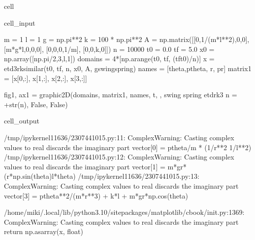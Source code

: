 \documentclass[letterpaper,10pt,english]{jupyterBook}
\begin{document}
\begin{sphinxuseclass}{cell}\begin{sphinxVerbatimInput}

\begin{sphinxuseclass}{cell_input}
\begin{sphinxVerbatim}[commandchars=\\\{\}]
m = 1
l = 1
g = np.pi**2
k = 100 * np.pi**2
A = np.matrix([[0,\PYGZhy{}1/(m*l**2),0,0], [m*g*l,0,0,0], [0,0,0,\PYGZhy{}1/m], [0,0,k,0]])
n = 10000
t0 = 0.0
tf = 5.0
x0 = np.array([np.pi/2,3,l,1])
domains = 4*[np.arange(t0, tf, (tf\PYGZhy{}t0)/n)]
x = etd3rk\PYGZus{}similar(t0, tf, n, x0, A, g\PYGZus{}swing\PYGZus{}spring)
names = [\PYGZsq{}theta\PYGZsq{},\PYGZsq{}p\PYGZus{}theta\PYGZsq{}, \PYGZsq{}r\PYGZsq{}, \PYGZsq{}pr\PYGZsq{}]
matrix1 = [x[0,:], x[1,:], x[2,:], x[3,:]]

fig1, ax1 = graphic\PYGZus{}2D(domains, matrix1, names, \PYGZsq{}t\PYGZsq{}, \PYGZsq{} \PYGZsq{}, \PYGZsq{}swing spring etdrk3 n = \PYGZsq{}+str(n), False, False)
\end{sphinxVerbatim}

\end{sphinxuseclass}\end{sphinxVerbatimInput}
\begin{sphinxVerbatimOutput}

\begin{sphinxuseclass}{cell_output}
\begin{sphinxVerbatim}[commandchars=\\\{\}]
/tmp/ipykernel\PYGZus{}11636/2307441015.py:11: ComplexWarning: Casting complex values to real discards the imaginary part
  vector[0] = p\PYGZus{}theta/m * (1/r**2 \PYGZhy{} 1/l**2)
/tmp/ipykernel\PYGZus{}11636/2307441015.py:12: ComplexWarning: Casting complex values to real discards the imaginary part
  vector[1] = \PYGZhy{}m*gr*(r*np.sin(theta)\PYGZhy{}l*theta)
/tmp/ipykernel\PYGZus{}11636/2307441015.py:13: ComplexWarning: Casting complex values to real discards the imaginary part
  vector[3] = p\PYGZus{}theta**2/(m*r**3) + k*l + m*gr*np.cos(theta)
\end{sphinxVerbatim}

\begin{sphinxVerbatim}[commandchars=\\\{\}]
/home/miki/.local/lib/python3.10/site\PYGZhy{}packages/matplotlib/cbook/\PYGZus{}\PYGZus{}init\PYGZus{}\PYGZus{}.py:1369: ComplexWarning: Casting complex values to real discards the imaginary part
  return np.asarray(x, float)
\end{sphinxVerbatim}

\noindent{}

\end{sphinxuseclass}\end{sphinxVerbatimOutput}

\end{sphinxuseclass}
\sphinxstepscope
\end{document}
